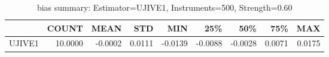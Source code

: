 \begin{table}[ht]
\centering
\caption{bias summary: Estimator=UJIVE1, Instruments=500, Strength=0.60}
\begin{tabular}{lrrrrrrrr}
\toprule
 & COUNT & MEAN & STD & MIN & 25\% & 50\% & 75\% & MAX \\
\midrule
UJIVE1 & 10.0000 & -0.0002 & 0.0111 & -0.0139 & -0.0088 & -0.0028 & 0.0071 & 0.0175 \\
\bottomrule
\end{tabular}
\end{table}
